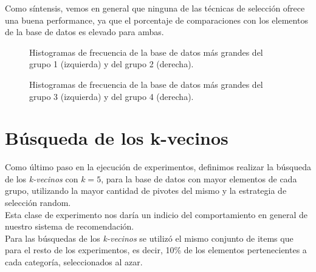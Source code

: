 Como s\'intensis, vemos en general que ninguna de las t\'ecnicas de selecci\'on ofrece una buena performance, ya que el porcentaje de comparaciones con los elementos de la base de datos es elevado para ambas.\\

\begin{figure}[tb]
\centering
{}
		\caption{\small Histogramas de frecuencia de la base de datos m\'as grandes del grupo 1 (izquierda) y del grupo 2 (derecha).}
		\label{fig:HF1}
		
	\caption{\small Histogramas de frecuencia de la base de datos m\'as grandes del grupo 3 (izquierda) y del grupo 4 (derecha).}
		\label{fig:HF2}
\end{figure}


\section{B\'usqueda de los k-vecinos}

Como \'ultimo paso en la ejecuci\'on de experimentos, definimos realizar la b\'usqueda de los \textit{k-vecinos} con $k=5$, para la base de datos con mayor elementos de cada grupo, utilizando la mayor cantidad de pivotes del mismo y la estrategia de selecci\'on random.\\

Esta clase de experimento nos dar\'ia un indicio del comportamiento en general de nuestro sistema de recomendaci\'on.\\

Para las b\'usquedas de los \textit{k-vecinos} se utiliz\'o el mismo conjunto de items que para el resto de los experimentos, es decir, 10\% de los elementos pertenecientes a cada categor\'ia, seleccionados al azar.\\

